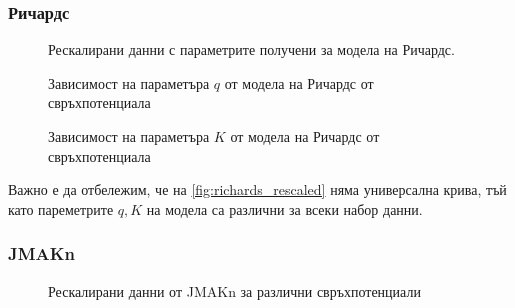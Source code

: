 \subsubsection{Ричардс}
\begin{figure}[hbpt]
    \centering
    \caption{Рескалирани данни с параметрите получени за модела на Ричардс.}
    \label{fig:richards_rescaled}
\end{figure}
\begin{figure}[H]
    \centering
    \caption{Зависимост на параметъра $q$ от модела на Ричардс от свръхпотенциала}
\end{figure}
\begin{figure}[H]
    \centering
    \caption{Зависимост на параметъра $K$ от модела на Ричардс от свръхпотенциала}
\end{figure}

Важно е да отбележим, че на \autoref{fig:richards_rescaled} няма универсална крива, тъй като пареметрите $q, K$ на модела са различни за всеки набор данни.
\subsubsection{JMAKn}
\begin{figure}[H]
    \centering
    \caption{Рескалирани данни от JMAKn за различни свръхпотенциали}
\end{figure}


